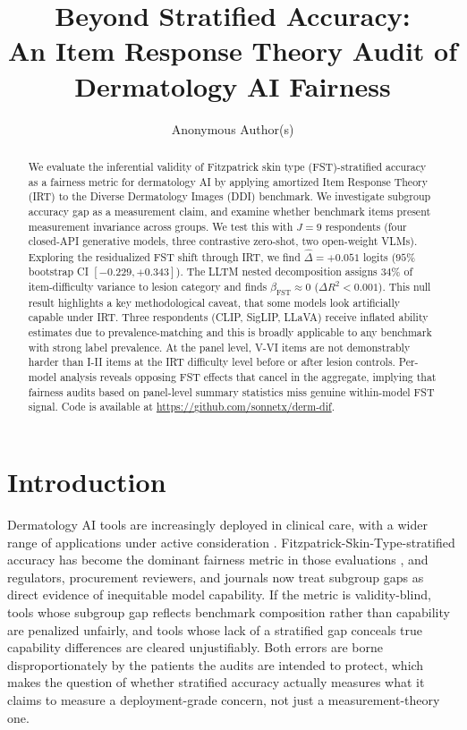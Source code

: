 \documentclass{article}
\title{Beyond Stratified Accuracy:\\An Item Response Theory Audit of Dermatology AI Fairness}
\author{%
  Anonymous Author(s)
}
\begin{document}
\maketitle

\begin{abstract}
We evaluate the inferential validity of Fitzpatrick skin type (FST)-stratified accuracy as a fairness metric for dermatology AI by applying amortized Item Response Theory (IRT) to the Diverse Dermatology Images (DDI) benchmark. We investigate subgroup accuracy gap as a measurement claim, and examine whether benchmark items present measurement invariance across groups. We test this with $J = 9$ respondents (four closed-API generative models, three contrastive zero-shot, two open-weight VLMs). Exploring the residualized FST shift through IRT, we find $\hat\Delta = +0.051$ logits ($95\%$ bootstrap CI $[-0.229, +0.343]$). The LLTM nested decomposition assigns $34\%$ of item-difficulty variance to lesion category and finds $\beta_{\text{FST}} \approx 0$ ($\Delta R^2 < 0.001$). This null result highlights a key methodological caveat, that some models look artificially capable under IRT. Three respondents (CLIP, SigLIP, LLaVA) receive inflated ability estimates due to prevalence-matching and this is broadly applicable to any benchmark with strong label prevalence. At the panel level, V-VI items are not demonstrably harder than I-II items at the IRT difficulty level before or after lesion controls. Per-model analysis reveals opposing FST effects that cancel in the aggregate, implying that fairness audits based on panel-level summary statistics miss genuine within-model FST signal. Code is available at \url{https://github.com/sonnetx/derm-dif}.
\end{abstract}

\section{Introduction}
\label{sec:intro}

Dermatology AI tools are increasingly deployed in clinical care, with a wider range of applications under active consideration \citep{daneshjou2022disparities}. Fitzpatrick-Skin-Type-stratified accuracy has become the dominant fairness metric in those evaluations \citep{daneshjou2022disparities, groh2021evaluating}, and regulators, procurement reviewers, and journals now treat subgroup gaps as direct evidence of inequitable model capability. If the metric is validity-blind, tools whose subgroup gap reflects benchmark composition rather than capability are penalized unfairly, and tools whose lack of a stratified gap conceals true capability differences are cleared unjustifiably. Both errors are borne disproportionately by the patients the audits are intended to protect, which makes the question of whether stratified accuracy actually measures what it claims to measure a deployment-grade concern, not just a measurement-theory one.
\end{document}

